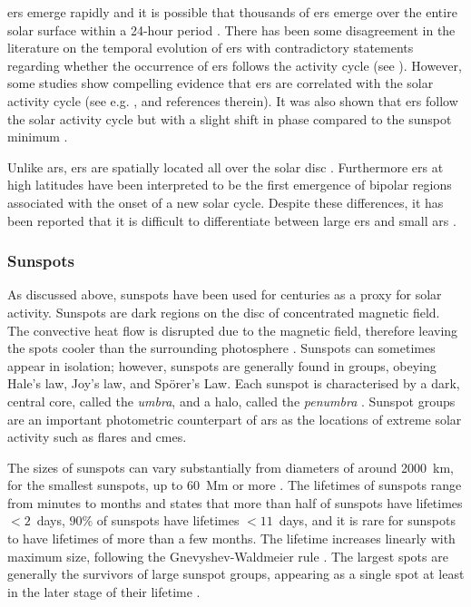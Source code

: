 \glspl{er} emerge rapidly and it is possible that thousands of \glspl{er} emerge over the entire solar surface within a 24-hour period \citep{harvey_solar_2001}. There has been some disagreement in the literature on the temporal evolution of \glspl{er} with contradictory statements regarding whether the occurrence of \glspl{er} follows the activity cycle (see \citet{harvey_properties_1993, hagenaar_ephemeral_2001, vieira_evolution_2010}). However, some studies show compelling evidence that \glspl{er} are correlated with the solar activity cycle (see e.g. \citet{vieira_evolution_2010,chaplin_sensitivity_2019}, and references therein). It was also shown that \glspl{er} follow the solar activity cycle but with a slight shift in phase compared to the sunspot minimum \citep{harvey_ephemeral_1973, martin_ephemeral_1979}.

Unlike \glspl{ar}, \glspl{er} are spatially located all over the solar disc \citep{harvey_solar_2001}. Furthermore \glspl{er} at high latitudes have been interpreted to be the first emergence of bipolar regions associated with the onset of a new solar cycle. Despite these differences, it has been reported that it is difficult to differentiate between large \glspl{er} and small \glspl{ar} \citep{harvey_solar_2001}.



\subsubsection*{Sunspots}

As discussed above, sunspots have been used for centuries as a proxy for solar activity. Sunspots are dark regions on the disc of concentrated magnetic field. The convective heat flow is disrupted due to the magnetic field, therefore leaving the spots cooler than the surrounding photosphere \citep{solanki_sunspots_2003, hathaway_solar_2015}. Sunspots can sometimes appear in isolation; however, sunspots are generally found in groups, obeying Hale's law, Joy's law, and Sp\"{o}rer’s Law. Each sunspot
is characterised by a dark, central core, called the \textit{umbra}, and a halo, called the \textit{penumbra} \citep{howard_sunspot_2001, solanki_sunspots_2003}. Sunspot groups are an important photometric counterpart of \glspl{ar} as the locations of extreme solar activity such as flares and \glspl{cme}.

The sizes of sunspots can vary substantially from diameters of around 2000~km, for the smallest sunspots, up to 60~Mm or more \citep{howard_sunspot_2001,solanki_sunspots_2003}. The lifetimes of sunspots range from minutes to months \citep{howard_sunspot_2001, solanki_sunspots_2003} and \citet{howard_sunspot_2001} states that more than half of sunspots have lifetimes $<2$~days, $90\%$ of sunspots have lifetimes $<11$~days, and it is rare for sunspots to have lifetimes of more than a few months. The lifetime increases linearly with maximum size, following the Gnevyshev-Waldmeier rule \citep{gnevyshev_notitle_1938, waldmeier_ergebnisse_1955}. The largest spots are generally the survivors of large sunspot groups, appearing as a single spot at least in the later stage of their lifetime \citep{howard_sunspot_2001}.

